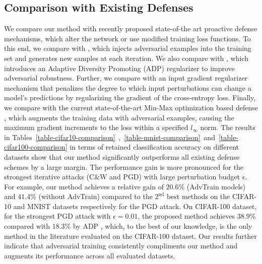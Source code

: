 \documentclass[10pt,twocolumn,letterpaper]{article}
\begin{document}
\subsection{Comparison with Existing Defenses}
\label{subsec:comparison}
\vspace{-0.5em}

We compare our method with recently proposed state-of-the art proactive defense mechanisms, which alter the network or use modified training loss functions. To this end, we compare with \cite{kurakin2016adversarial_2}, which injects adversarial examples into the training set and generates new samples at each iteration. We also compare with \cite{pang2019improving}, which introduces an Adaptive Diversity Promoting (ADP) regularizer to improve adversarial robustness. Further, we compare with an input gradient regularizer mechanism \cite{ross2018improving} that penalizes the degree to which input perturbations can change a model's predictions by regularizing the gradient of the cross-entropy loss. Finally, we compare with the current state-of-the-art Min-Max optimization based defense \cite{madry2017towards}, which augments the training data with adversarial examples, causing the maximum gradient increments to the loss within a specified $l_\infty$ norm.
The results in Tables~\ref{table-cifar10-comparison}~,~\ref{table-mnist-comparison}~and~\ref{table-cifar100-comparison} in terms of retained classification accuracy on different datasets show that our method significantly outperforms all existing defense schemes by a large margin. The performance gain is more pronounced for the strongest iterative attacks (\eg C\&W and PGD) with large perturbation budget $\epsilon$. For example, our method achieves a relative gain of $20.6\%$ (AdvTrain models) and $41.4\%$ (without AdvTrain) compared to the $2^{\text{nd}}$ best methods on the CIFAR-10 and MNIST datasets respectively for the PGD attack.
On CIFAR-100 dataset, for the strongest PGD attack with $\epsilon=0.01$, the proposed method achieves $38.9\%$ compared with $18.3\%$ by ADP \cite{pang2019improving}, which, to the best of our knowledge, is the only method in the literature evaluated on the CIFAR-100 dataset. Our results further indicate that adversarial training consistently compliments our method and augments its performance across all evaluated datasets.
\end{document}
